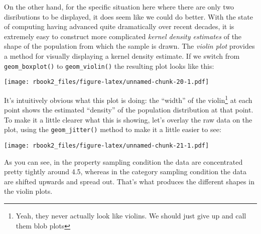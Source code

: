 \documentclass[]{book}
\newenvironment{Shaded}{\begin{snugshade}}{\end{snugshade}}
\newcommand{\DataTypeTok}[1]{\textcolor[rgb]{0.13,0.29,0.53}{#1}}
\newcommand{\KeywordTok}[1]{\textcolor[rgb]{0.13,0.29,0.53}{\textbf{#1}}}
\newcommand{\NormalTok}[1]{#1}
\newcommand{\OperatorTok}[1]{\textcolor[rgb]{0.81,0.36,0.00}{\textbf{#1}}}
\newcommand{\StringTok}[1]{\textcolor[rgb]{0.31,0.60,0.02}{#1}}
\let\rmarkdownfootnote\footnote%
\def\footnote{\protect\rmarkdownfootnote}
\begin{document}
On the other hand, for the specific situation here where there are only two disributions to be displayed, it does seem like we could do better. With the state of computing having advanced quite dramatically over recent decades, it is extremely easy to construct more complicated \emph{kernel density estimates} of the shape of the population from which the sample is drawn. The \emph{violin plot} provides a method for visually displaying a kernel density estimate. If we switch from \texttt{geom\_boxplot()} to \texttt{geom\_violin()} the resulting plot looks like this:

\begin{Shaded}
\end{Shaded}

\texttt{[image: rbook2\_files/figure-latex/unnamed-chunk-20-1.pdf]}

It's intuitively obvious what this plot is doing: the ``width'' of the violin\footnote{Yeah, they never actually look like violins. We should just give up and call them blob plots} at each point shows the estimated ``density'' of the population distribution at that point. To make it a little clearer what this is showing, let's overlay the raw data on the plot, using the \texttt{geom\_jitter()} method to make it a little easier to see:

\begin{Shaded}
\end{Shaded}

\texttt{[image: rbook2\_files/figure-latex/unnamed-chunk-21-1.pdf]}

As you can see, in the property sampling condition the data are concentrated pretty tightly around 4.5, whereas in the category sampling condition the data are shifted upwards and spread out. That's what produces the different shapes in the violin plots.
\end{document}

